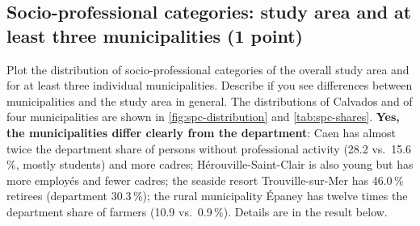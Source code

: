 \subsection{Socio-professional categories: study area and at least three municipalities (1 point)}

\begin{qa}{Plot the distribution of socio-professional categories of the overall study area and for at least three
individual municipalities. Describe if you see differences between municipalities and the study area in general.}
The distributions of Calvados and of four municipalities are shown in \cref{fig:spc-distribution} and
\cref{tab:spc-shares}. \textbf{Yes, the municipalities differ clearly from the department}: Caen has almost twice the
department share of persons without professional activity (28.2 vs.\ 15.6\,\%, mostly students) and more cadres;
H\'erouville-Saint-Clair is also young but has more employ\'es and fewer cadres; the seaside resort Trouville-sur-Mer
has 46.0\,\% retirees (department 30.3\,\%); the rural municipality \'Epaney has twelve times the department share of
farmers (10.9 vs.\ 0.9\,\%). Details are in the result below.
\end{qa}

